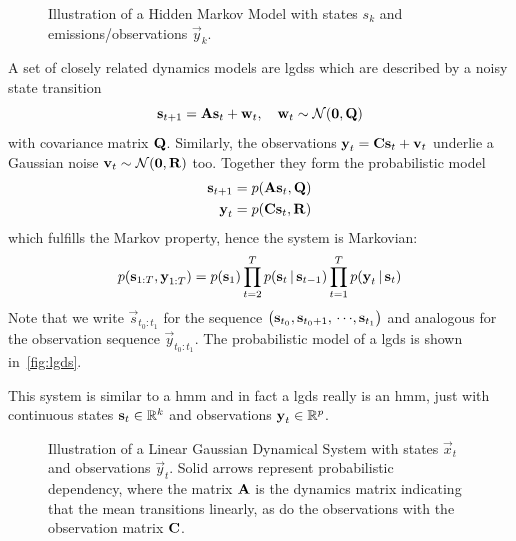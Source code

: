 	\begin{figure}[t]
		\centering
		\tikzHiddenMarkovModel
		\caption[Illustration of a hidden Markov model]{Illustration of a Hidden Markov Model with states \(s_k\) and emis\-sions/observations \(\vec{y}_k\).}
		\label{fig:hiddenMarkovModel}
	\end{figure}

	A set of closely related dynamics models are \acp{lgds} which are described by a noisy state transition
	\begin{equation*}
		\boldsymbol{\mathrm{s}}_{t + 1} = \boldsymbol{\mathrm{A}} \boldsymbol{\mathrm{s}}_t + \boldsymbol{\mathrm{w}}_t,\quad \boldsymbol{\mathrm{w}}_t \sim \mathcal{N}(\boldsymbol{\mathrm{0}}, \boldsymbol{\mathrm{Q}})
	\end{equation*}
	with covariance matrix \(\boldsymbol{\mathrm{Q}}\). Similarly, the observations \( \boldsymbol{\mathrm{y}}_t = \boldsymbol{\mathrm{C}} \boldsymbol{\mathrm{s}}_t + \boldsymbol{\mathrm{v}}_t \) underlie a Gaussian noise \( \boldsymbol{\mathrm{v}}_t \sim \mathcal{N}(\boldsymbol{\mathrm{0}}, \boldsymbol{\mathrm{R}}) \) too. Together they form the probabilistic model
	\begin{align*}
		\boldsymbol{\mathrm{s}}_{t + 1} &= p(\boldsymbol{\mathrm{A}} \boldsymbol{\mathrm{s}}_t, \boldsymbol{\mathrm{Q}}) \\
		\boldsymbol{\mathrm{y}}_t &= p(\boldsymbol{\mathrm{C}} \boldsymbol{\mathrm{s}}_t, \boldsymbol{\mathrm{R}})
	\end{align*}
	which fulfills the Markov property, hence the system is Markovian:
	\begin{equation*}
		p(\boldsymbol{\mathrm{s}}_{1:T}, \boldsymbol{\mathrm{y}}_{1:T}) = p(\boldsymbol{\mathrm{s}}_1) \prod_{t = 2}^{T} p(\boldsymbol{\mathrm{s}}_t \,\vert\, \boldsymbol{\mathrm{s}}_{t - 1}) \prod_{t = 1}^{T} p(\boldsymbol{\mathrm{y}}_t \,\vert\, \boldsymbol{\mathrm{s}}_t)
	\end{equation*}
	Note that we write \( \vec{s}_{t_0:t_1} \) for the sequence \( \big( \boldsymbol{\mathrm{s}}_{t_0}, \boldsymbol{\mathrm{s}}_{t_0 + 1}, \,\cdots\!, \boldsymbol{\mathrm{s}}_{t_1} \big) \) and analogous for the observation sequence \( \vec{y}_{t_0:t_1} \). The probabilistic model of a \ac{lgds} is shown in~\autoref{fig:lgds}.

	This system is similar to a \ac{hmm} and in fact a \ac{lgds} really is an \ac{hmm}, just with continuous states \( \boldsymbol{\mathrm{s}}_t \in \mathbb{R}^k \) and observations \( \boldsymbol{\mathrm{y}}_t \in \mathbb{R}^p \).

	\begin{figure}
		\centering
		\tikzLinearGaussianDynamicalSystem
		\caption[Illustration of a LGDS]{Illustration of a Linear Gaussian Dynamical System with states \(\vec{x}_t\) and observations \(\vec{y}_t\). Solid arrows represent probabilistic dependency, where the matrix \(\boldsymbol{\mathrm{A}}\) is the dynamics matrix indicating that the mean transitions linearly, as do the observations with the observation matrix \(\boldsymbol{\mathrm{C}}\).}
		\label{fig:lgds}
	\end{figure}

